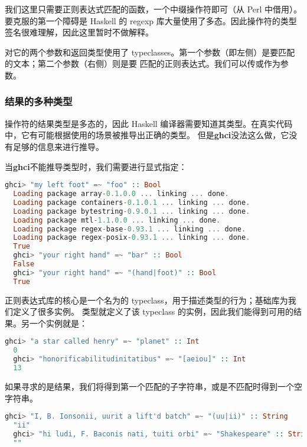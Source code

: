 \documentclass[./main.tex]{subfiles}
\begin{document}
我们这里只需要正则表达式匹配的函数，一个中缀操作符\acode{(=~)}即可（从 Perl 中借用）。要克服的第一个障碍是 Haskell 的 regexp
库大量使用了多态。因此\acode{(=~)}操作符的类型签名很难理解，因此这里暂时不做解释。

\acode{=~}对它的两个参数和返回类型使用了 typeclasses。第一个参数（即\acode{=~}左侧）是要匹配的文本；第二个参数（右侧）则是要
匹配的正则表达式。我们可以传或作为参数。

\subsubsection*{结果的多种类型}

\acode{=~}操作符的结果类型是多态的，因此 Haskell 编译器需要知道其类型。在真实代码中，它有可能根据使用的场景被推导出正确的类型。
但是\textbf{ghci}没法这么做，它没有足够的信息来进行推导。

当\textbf{ghci}不能推导类型时，我们需要进行显式指定：

\begin{lstlisting}[language=Haskell]
  ghci> "my left foot" =~ "foo" :: Bool
  Loading package array-0.1.0.0 ... linking ... done.
  Loading package containers-0.1.0.1 ... linking ... done.
  Loading package bytestring-0.9.0.1 ... linking ... done.
  Loading package mtl-1.1.0.0 ... linking ... done.
  Loading package regex-base-0.93.1 ... linking ... done.
  Loading package regex-posix-0.93.1 ... linking ... done.
  True
  ghci> "your right hand" =~ "bar" :: Bool
  False
  ghci> "your right hand" =~ "(hand|foot)" :: Bool
  True
\end{lstlisting}

正则表达式库的核心是一个名为的 typeclass，用于描述类型的行为；基础库为我们定义了很多实例。
类型就定义了该 typeclass 的实例，因此我们能得到可用的结果。另一个实例就是：

\begin{lstlisting}[language=Haskell]
  ghci> "a star called henry" =~ "planet" :: Int
  0
  ghci> "honorificabilitudinitatibus" =~ "[aeiou]" :: Int
  13
\end{lstlisting}

如果寻求的是结果，我们将得到第一个匹配的子字符串，或是不匹配时得到一个空字符串。

\begin{lstlisting}[language=Haskell]
  ghci> "I, B. Ionsonii, uurit a lift'd batch" =~ "(uu|ii)" :: String
  "ii"
  ghci> "hi ludi, F. Baconis nati, tuiti orbi" =~ "Shakespeare" :: String
  ""
\end{lstlisting}
\end{document}
